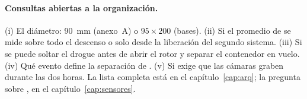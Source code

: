 \paragraph{Consultas abiertas a la organización.} (i) El diámetro: \SI{90}{mm} (anexo~A) o
$95\times200$ (bases). (ii) Si el promedio de  se mide sobre todo el descenso o solo
desde la liberación del segundo sistema. (iii) Si se puede soltar el drogue antes de abrir
el rotor y separar el contenedor en vuelo. (iv) Qué evento define la separación de .
(v) Si  exige que las cámaras graben durante las dos horas. La lista completa está en
el capítulo~\ref{cap:arq}; la pregunta sobre , en el capítulo~\ref{cap:sensores}.
